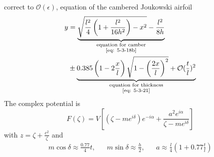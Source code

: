 \begin{enumerate}[label = (\alph*)]
correct to $\mathcal{O}(\epsilon)$, equation of the cambered Joukowski airfoil
\begin{equation}
\begin{aligned}
y 
&= \underbrace{\sqrt{\frac{l^2}{4}\left(1+\frac{l^2}{16h^2}\right)-x^2}-\frac{l^2}{8h}}_{
\begin{subarray}{c}
  \text{equation for camber}\\
  \text{\eqref{eq: 5-3-18b}}
\end{subarray}
} \\
&\pm\underbrace{ 0.385\left(1-2\frac{x}{l}\right)\sqrt{1-\left(\frac{2x}{l}\right)^2} + \mathcal{O}(\frac{t}{l})^2}_{
\begin{subarray}{c}
  \text{equation for thickness}\\
  \text{\eqref{eq: 5-3-21}}
\end{subarray}
}
\end{aligned}
\label{eq: 5-3-23}
\end{equation}
The complex potential is
\begin{equation}
F(\zeta) = V\left[\left(\zeta - me^{i\delta}\right)e^{-i\alpha} + \frac{a^2e^{i\alpha}}{\zeta - me^{i\delta}}\right]
\label{eq: 5-3-24}
\end{equation}
with $\displaystyle z = \zeta + \frac{c^2}{\zeta}$ and
\begin{align*}
m\cos\delta\approx\frac{0.77}{4}t, && m\sin\delta\approx\frac{h}{2}, && a\approx\frac{l}{4}\left(1+0.77\frac{t}{l}\right)
\end{align*}
\end{enumerate}
